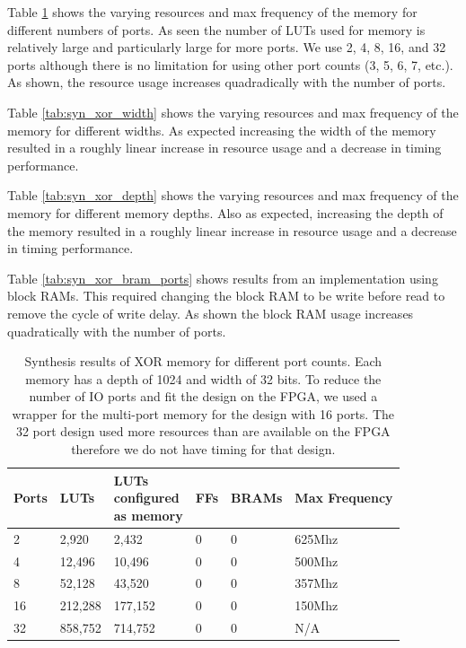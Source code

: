 \documentclass[sigconf,nonacm]{acmart}
\begin{document}
Table \ref{tab:syn_xor_ports} shows the varying resources and max frequency of the memory for different numbers of ports. As seen the number of LUTs used for memory is relatively large and particularly large for more ports. We use 2, 4, 8, 16, and 32 ports although there is no limitation for using other port counts (3, 5, 6, 7, etc.). As shown, the resource usage increases quadradically with the number of ports.

Table \ref{tab:syn_xor_width} shows the varying resources and max frequency of the memory for different widths. As expected increasing the width of the memory resulted in a roughly linear increase in resource usage and a decrease in timing performance.

Table \ref{tab:syn_xor_depth} shows the varying resources and max frequency of the memory for different memory depths. Also as expected, increasing the depth of the memory resulted in a roughly linear increase in resource usage and a decrease in timing performance.

Table \ref{tab:syn_xor_bram_ports} shows results from an implementation using block RAMs. This required changing the block RAM to be write before read to remove the cycle of write delay. As shown the block RAM usage increases quadratically with the number of ports.

\begin{table}
  \caption{Synthesis results of XOR memory for different port counts. Each memory has a depth of 1024 and width of 32 bits. To reduce the number of IO ports and fit the design on the FPGA, we used a wrapper for the multi-port memory for the design with 16 ports. The 32 port design used more resources than are available on the FPGA therefore we do not have timing for that design.}
  \label{tab:syn_xor_ports}
  \begin{tabular}{llllll}
    \toprule
    Ports & LUTs & \thead{LUTs\\ configured\\ as memory} & FFs & BRAMs & Max Frequency\\
    \midrule
    2 & 2,920 & 2,432 & 0 & 0 & 625Mhz\\
    4 & 12,496 & 10,496 & 0 & 0 & 500Mhz\\
    8 & 52,128 & 43,520 & 0 & 0 & 357Mhz\\
    16 & 212,288 & 177,152 & 0 & 0 & 150Mhz\\
    32 & 858,752 & 714,752 & 0 & 0 & N/A\\
    \bottomrule
  \end{tabular}
\end{table}
\end{document}
